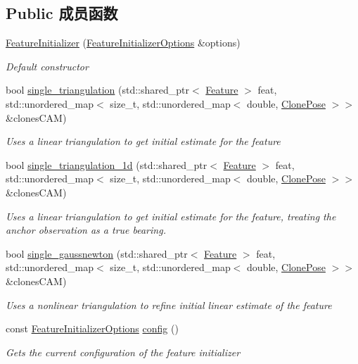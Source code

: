\subsection*{Public 成员函数}
\begin{DoxyCompactItemize}
\item 
\hyperlink{classov__core_1_1FeatureInitializer_afa2efde962719a502507044379644e63}{Feature\+Initializer} (\hyperlink{structov__core_1_1FeatureInitializerOptions}{Feature\+Initializer\+Options} \&options)
\begin{DoxyCompactList}\small\item\em Default constructor \end{DoxyCompactList}\item 
bool \hyperlink{classov__core_1_1FeatureInitializer_a86e8f87f677689e6588516f8d08086d7}{single\+\_\+triangulation} (std\+::shared\+\_\+ptr$<$ \hyperlink{classov__core_1_1Feature}{Feature} $>$ feat, std\+::unordered\+\_\+map$<$ size\+\_\+t, std\+::unordered\+\_\+map$<$ double, \hyperlink{structov__core_1_1FeatureInitializer_1_1ClonePose}{Clone\+Pose} $>$$>$ \&clones\+C\+AM)
\begin{DoxyCompactList}\small\item\em Uses a linear triangulation to get initial estimate for the feature \end{DoxyCompactList}\item 
bool \hyperlink{classov__core_1_1FeatureInitializer_a97e8070e331293368ed1fedd62458d5e}{single\+\_\+triangulation\+\_\+1d} (std\+::shared\+\_\+ptr$<$ \hyperlink{classov__core_1_1Feature}{Feature} $>$ feat, std\+::unordered\+\_\+map$<$ size\+\_\+t, std\+::unordered\+\_\+map$<$ double, \hyperlink{structov__core_1_1FeatureInitializer_1_1ClonePose}{Clone\+Pose} $>$$>$ \&clones\+C\+AM)
\begin{DoxyCompactList}\small\item\em Uses a linear triangulation to get initial estimate for the feature, treating the anchor observation as a true bearing. \end{DoxyCompactList}\item 
bool \hyperlink{classov__core_1_1FeatureInitializer_a27eb3af3c4e22473e795966eff800599}{single\+\_\+gaussnewton} (std\+::shared\+\_\+ptr$<$ \hyperlink{classov__core_1_1Feature}{Feature} $>$ feat, std\+::unordered\+\_\+map$<$ size\+\_\+t, std\+::unordered\+\_\+map$<$ double, \hyperlink{structov__core_1_1FeatureInitializer_1_1ClonePose}{Clone\+Pose} $>$$>$ \&clones\+C\+AM)
\begin{DoxyCompactList}\small\item\em Uses a nonlinear triangulation to refine initial linear estimate of the feature \end{DoxyCompactList}\item 
const \hyperlink{structov__core_1_1FeatureInitializerOptions}{Feature\+Initializer\+Options} \hyperlink{classov__core_1_1FeatureInitializer_ae12109c70cee2ce4d11c2a1b345654b8}{config} ()
\begin{DoxyCompactList}\small\item\em Gets the current configuration of the feature initializer \end{DoxyCompactList}\end{DoxyCompactItemize}
